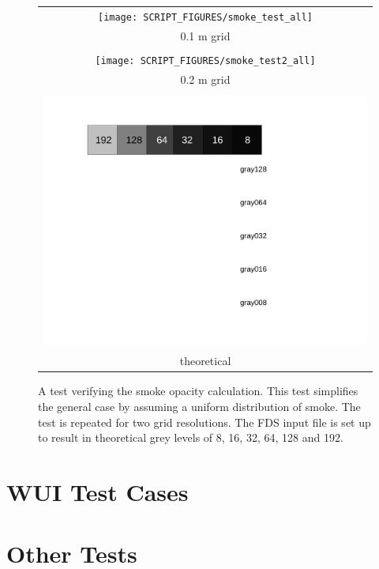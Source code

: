 \documentclass[11pt,twoside]{book}
\begin{document}
\begin{figure}[bph]
\begin{center}
 \centering
\begin{tabular}{c}
 \texttt{[image: SCRIPT\_FIGURES/smoke\_test\_all]}\\
0.1 m grid\\ \\
 \texttt{[image: SCRIPT\_FIGURES/smoke\_test2\_all]} \\ 
0.2 m grid\\ \\
 \includegraphics[width=5.00in]{FIGURES/graysquares}\\
 theoretical 
 \end{tabular}
\end{center}
 \caption[A test verifying the smoke opacity calculation]{A test verifying the
 smoke opacity calculation.  This test simplifies
  the general case by assuming a uniform distribution of smoke.  The test is
  repeated for two grid resolutions.  The FDS input
  file is set up to result in theoretical grey levels of 8, 16, 32, 64, 128
  and 192.}
\label{figsmoketest2}%
\end{figure}


\chapter{WUI Test Cases}
\newcommand{\npage}{}
\newcommand{\chap}{chapter}


\chapter{Other Tests}
\end{document}
